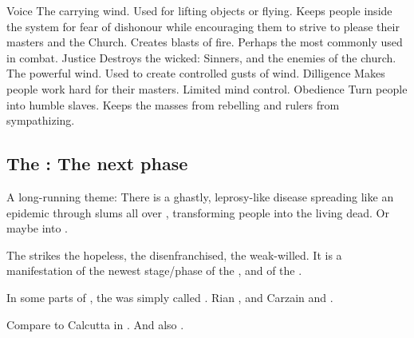 \begin{comment}
\subsubsection{\Zumir, the Voice}
\end{comment}
\begin{sephirahlist}{Voice}
\sephitem
  {\Atzirah}
  {\male}
  {The carrying wind. Used for lifting objects or flying.}
  {\Honour}
  {Keeps people inside the system for fear of dishonour while encouraging them to strive to please their masters and the Church.}
\sephitem
  {\Izion}
  {\male}
  {Creates blasts of fire. Perhaps the \Sephirah{} most commonly used in combat. }
  {Justice}
  {Destroys the wicked: Sinners, and the enemies of the church.}
\sephitem
  {\Keshirah}
  {\female}
  {The powerful wind. Used to create controlled gusts of wind. }
  {Dilligence}
  {Makes people work hard for their masters.}
\sephitem
  {\Thimared}
  {\female}
  {Limited mind control.}
  {Obedience}
  {Turn people into humble slaves. Keeps the masses from rebelling and rulers from sympathizing.}
\end{sephirahlist}







\subsection{The \Morbus: The next phase}
A long-running theme: 
There is a ghastly, leprosy-like disease spreading like an epidemic through slums all over \Azmith, transforming people into the living dead. Or maybe into . 

The \Morbus{} strikes the hopeless, the disenfranchised, the weak-willed. It is a manifestation of the newest stage/phase of the , and of the . 

In some parts of \Azmith, the \Morbus was simply called . 
Rian , and Carzain  and . 

Compare to Calcutta in . And also . 


